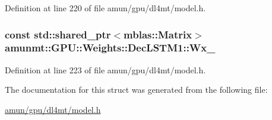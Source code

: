 Definition at line 220 of file amun/gpu/dl4mt/model.\+h.

\subsubsection[{\texorpdfstring{Wx\+\_\+}{Wx_}}]{\setlength{\rightskip}{0pt plus 5cm}const std\+::shared\+\_\+ptr$<${\bf mblas\+::\+Matrix}$>$ amunmt\+::\+G\+P\+U\+::\+Weights\+::\+Dec\+L\+S\+T\+M1\+::\+Wx\+\_\+}\hypertarget{structamunmt_1_1GPU_1_1Weights_1_1DecLSTM1_a0e3e607b5895d2344f03965abba9a1b9}{}\label{structamunmt_1_1GPU_1_1Weights_1_1DecLSTM1_a0e3e607b5895d2344f03965abba9a1b9}


Definition at line 223 of file amun/gpu/dl4mt/model.\+h.



The documentation for this struct was generated from the following file\+:\begin{DoxyCompactItemize}
\item 
\hyperlink{amun_2gpu_2dl4mt_2model_8h}{amun/gpu/dl4mt/model.\+h}\end{DoxyCompactItemize}

